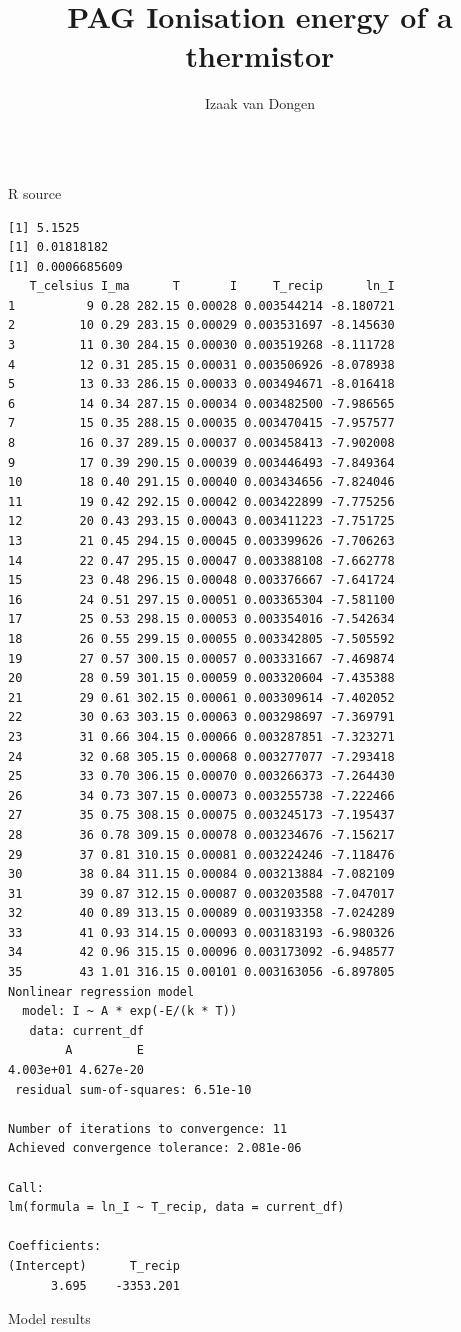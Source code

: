\documentclass[a4paper,11pt]{article}
\title{PAG Ionisation energy of a thermistor}
\author{Izaak van Dongen}
\newenvironment{longlisting}
{\addvspace{\baselineskip}\captionsetup{type=listing}}
{\addvspace{\baselineskip}}
\begin{document}
    \maketitle%

\begin{longlisting}
\inputminted{R}{analyse.r}
\caption{R source}
\end{longlisting}

\begin{longlisting}
\begin{verbatim}
[1] 5.1525
[1] 0.01818182
[1] 0.0006685609
   T_celsius I_ma      T       I     T_recip      ln_I
1          9 0.28 282.15 0.00028 0.003544214 -8.180721
2         10 0.29 283.15 0.00029 0.003531697 -8.145630
3         11 0.30 284.15 0.00030 0.003519268 -8.111728
4         12 0.31 285.15 0.00031 0.003506926 -8.078938
5         13 0.33 286.15 0.00033 0.003494671 -8.016418
6         14 0.34 287.15 0.00034 0.003482500 -7.986565
7         15 0.35 288.15 0.00035 0.003470415 -7.957577
8         16 0.37 289.15 0.00037 0.003458413 -7.902008
9         17 0.39 290.15 0.00039 0.003446493 -7.849364
10        18 0.40 291.15 0.00040 0.003434656 -7.824046
11        19 0.42 292.15 0.00042 0.003422899 -7.775256
12        20 0.43 293.15 0.00043 0.003411223 -7.751725
13        21 0.45 294.15 0.00045 0.003399626 -7.706263
14        22 0.47 295.15 0.00047 0.003388108 -7.662778
15        23 0.48 296.15 0.00048 0.003376667 -7.641724
16        24 0.51 297.15 0.00051 0.003365304 -7.581100
17        25 0.53 298.15 0.00053 0.003354016 -7.542634
18        26 0.55 299.15 0.00055 0.003342805 -7.505592
19        27 0.57 300.15 0.00057 0.003331667 -7.469874
20        28 0.59 301.15 0.00059 0.003320604 -7.435388
21        29 0.61 302.15 0.00061 0.003309614 -7.402052
22        30 0.63 303.15 0.00063 0.003298697 -7.369791
23        31 0.66 304.15 0.00066 0.003287851 -7.323271
24        32 0.68 305.15 0.00068 0.003277077 -7.293418
25        33 0.70 306.15 0.00070 0.003266373 -7.264430
26        34 0.73 307.15 0.00073 0.003255738 -7.222466
27        35 0.75 308.15 0.00075 0.003245173 -7.195437
28        36 0.78 309.15 0.00078 0.003234676 -7.156217
29        37 0.81 310.15 0.00081 0.003224246 -7.118476
30        38 0.84 311.15 0.00084 0.003213884 -7.082109
31        39 0.87 312.15 0.00087 0.003203588 -7.047017
32        40 0.89 313.15 0.00089 0.003193358 -7.024289
33        41 0.93 314.15 0.00093 0.003183193 -6.980326
34        42 0.96 315.15 0.00096 0.003173092 -6.948577
35        43 1.01 316.15 0.00101 0.003163056 -6.897805
Nonlinear regression model
  model: I ~ A * exp(-E/(k * T))
   data: current_df
        A         E
4.003e+01 4.627e-20
 residual sum-of-squares: 6.51e-10

Number of iterations to convergence: 11
Achieved convergence tolerance: 2.081e-06

Call:
lm(formula = ln_I ~ T_recip, data = current_df)

Coefficients:
(Intercept)      T_recip
      3.695    -3353.201
\end{verbatim}
\caption{Model results}
\end{longlisting}
\end{document}
